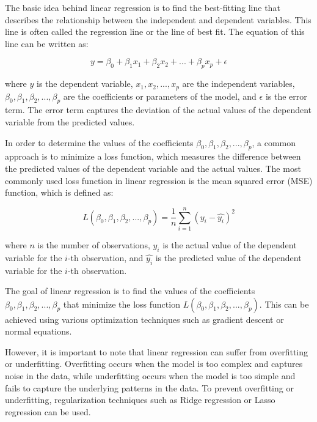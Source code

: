The basic idea behind linear regression is to find the best-fitting line that describes the relationship between the independent and dependent variables. This line is often called the regression line or the line of best fit. The equation of this line can be written as:

\begin{equation}
	y = \beta_0 + \beta_1 x_1 + \beta_2 x_2 + ... + \beta_p x_p + \epsilon
\end{equation}

where $y$ is the dependent variable, $x_1, x_2, ..., x_p$ are the independent variables, $\beta_0, \beta_1, \beta_2, ..., \beta_p$ are the coefficients or parameters of the model, and $\epsilon$ is the error term. The error term captures the deviation of the actual values of the dependent variable from the predicted values.

In order to determine the values of the coefficients $\beta_0, \beta_1, \beta_2, ..., \beta_p$, a common approach is to minimize a loss function, which measures the difference between the predicted values of the dependent variable and the actual values. The most commonly used loss function in linear regression is the mean squared error (MSE) function, which is defined as:

\begin{equation}
	L(\beta_0, \beta_1, \beta_2, ..., \beta_p) = \frac{1}{n} \sum_{i=1}^{n} (y_i - \hat{y_i})^2
\end{equation}

where $n$ is the number of observations, $y_i$ is the actual value of the dependent variable for the $i$-th observation, and $\hat{y_i}$ is the predicted value of the dependent variable for the $i$-th observation.

The goal of linear regression is to find the values of the coefficients $\beta_0, \beta_1, \beta_2, ..., \beta_p$ that minimize the loss function $L(\beta_0, \beta_1, \beta_2, ..., \beta_p)$. This can be achieved using various optimization techniques such as gradient descent or normal equations.

However, it is important to note that linear regression can suffer from overfitting or underfitting. Overfitting occurs when the model is too complex and captures noise in the data, while underfitting occurs when the model is too simple and fails to capture the underlying patterns in the data. To prevent overfitting or underfitting, regularization techniques such as Ridge regression or Lasso regression can be used.


